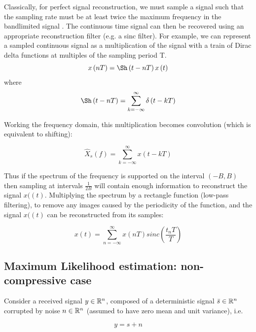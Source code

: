 \documentclass{article}
\begin{document}
Classically, for perfect signal reconstruction, we must sample a signal such that the sampling rate must be at least twice the maximum frequency in the bandlimited signal \cite{unser}. The continuous time signal can then be recovered using an appropriate reconstruction filter (e.g. a sinc filter). For example, we can represent a sampled continuous signal as a multiplication of the signal with a train of Dirac delta functions at multiples of the sampling period T.
%
\begin{equation}
x\left(nT\right) = \Sh\left(t-nT\right)x\left(t\right)
\end{equation}
%
where
%
\begin{equation}
\Sh\left(t-nT\right) = \sum_{k=-\infty}^{\infty} \delta\left(t - kT\right)
\end{equation}

Working the frequency domain, this multiplication becomes convolution (which is equivalent to shifting):

\begin{equation}
\hat{X}_{s}\left(f\right) = \sum_{k=-\infty}^\infty x\left(t - kT\right)
\end{equation}

Thus if the spectrum of the frequency is supported on the interval \(\left(-B, B\right)\) then sampling at intervals \(\frac{1}{2B}\) will contain enough information to reconstruct the signal \(x(\left(t\right)\). Multiplying the spectrum by a rectangle function (low-pass filtering), to remove any images caused by the periodicity of the function, and the signal \(x(\left(t\right)\) can be reconstructed from its samples:

\begin{equation}
x\left(t\right) = \sum_{n=-\infty}^\infty x\left(nT\right) sinc\left(\frac{t_nT}{T}\right)
\end{equation}


\subsection{Maximum Likelihood estimation: non-compressive case}\label{sec:max-like}

Consider a received signal \(y \in {\mathbb{R}}^n\), composed of a deterministic signal \(\bar{s} \in {\mathbb{R}}^n\) corrupted by noise \(n \in {\mathbb{R}}^n\) (assumed to have zero mean and unit variance), i.e.

\begin{equation}
y = s + n
\end{equation}
\end{document}
